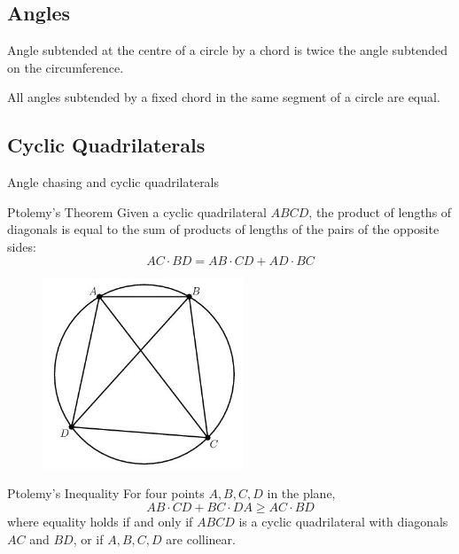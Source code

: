 \subsection{Angles}
Angle subtended at the centre of a circle by a chord is twice the angle subtended on the circumference.

All angles subtended by a fixed chord in the same segment of a circle are equal.

\subsection{Cyclic Quadrilaterals}
Angle chasing and cyclic quadrilaterals
\begin{thrm}{Ptolemy's Theorem}{}
Given a cyclic quadrilateral $ABCD$, the product of lengths of diagonals is equal to the sum of products of lengths of the pairs of the opposite sides: 
\begin{equation} AC \cdot BD = AB \cdot CD + AD \cdot BC \end{equation} 
\end{thrm}

\begin{figure}[H]
    \centering
    \includegraphics[width=6cm]{images/Ptolemys_theorem.jpg}
\end{figure}

\begin{thrm}{Ptolemy's Inequality}{}
For four points $A, B, C, D$ in the plane,
\begin{equation}
AB \cdot CD + BC \cdot DA \ge AC \cdot BD
\end{equation}
where equality holds if and only if $ABCD$ is a cyclic quadrilateral with diagonals $AC$ and $BD$, or if $A, B, C, D$ are collinear.
\end{thrm}

